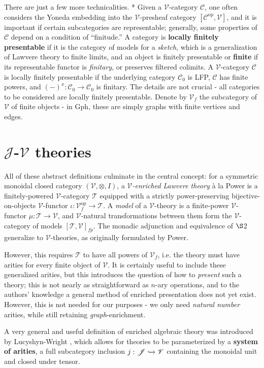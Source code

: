 \documentclass[a4paper,UKenglish]{article}
\theoremstyle{definition}
\newcommand{\Gph}{\mathrm{Gph}}
\newcommand{\op}{\mathrm{op}}
\newcommand{\V}{\mathscr{V}}
\newcommand{\C}{\mathscr{C}}
\newcommand{\T}{\mathscr{T}}
\newcommand{\J}{\mathscr{J}}
\begin{document}
There are just a few more technicalities. * Given a $\V$-category $\C$, one often considers the Yoneda embedding into the $\V$-presheaf category $[\C^\op, \V]$, and it is important if certain subcategories are representable; generally, some properties of $\C$ depend on a condition of ``finitude.'' \cite{finite} A category is \textbf{locally finitely presentable} if it is the category of models for a \textit{sketch}, which is a generalization of Lawvere theory to finite limits, and an object is finitely presentable or \textbf{finite} if its representable functor is \textit{finitary}, or preserves filtered colimits. A $\V$-category $\C$ is locally finitely presentable if the underlying category $\C_0$ is LFP, $\C$ has finite powers, and $(-)^x: \C_0 \to \C_0$ is finitary. The details are not crucial - all categories to be considered are locally finitely presentable. Denote by $\V_f$ the subcategory of $\V$ of finite objects - in $\Gph$, these are simply graphs with finite vertices and edges.\\

\section{$\J$-$\V$ theories}
All of these abstract definitions culminate in the central concept: for a symmetric monoidal closed category $(\V,\otimes,I)$, a \textit{$\V$-enriched Lawvere theory} \`a la Power \cite{power} is a finitely-powered $\V$-category $\T$ equipped with a strictly power-preserving bijective-on-objects $\V$-functor $\iota:\V_f^\op \to \T$. A \textit{model} of a $\V$-theory is a finite-power $\V$-functor $\mu:\T \to \V$, and $\V$-natural transformations between them form the $\V$-category of models $[\T,\V]_{fp}$. The monadic adjunction and equivalence of $\S$2 generalize to $\V$-theories, as originally formulated by Power.

However, this requires $\T$ to have all powers of $\V_f$, i.e. the theory must have arities for every finite object of $\V$. It is certainly useful to include these generalized arities, but this introduces the question of how to \textit{present} such a theory; this is not nearly as straightforward as $n$-ary operations, and to the authors' knowledge a general method of enriched presentation does not yet exist. However, this is not needed for our purposes - we only need \textit{natural number} arities, while still retaining \textit{graph}-enrichment.

A very general and useful definition of enriched algebraic theory was introduced by Lucyshyn-Wright \cite{rbb}, which allows for theories to be parameterized by a \textbf{system of arities}, a full subcategory inclusion $j: \J \xhookrightarrow{} \V$ containing the monoidal unit and closed under tensor.
\end{document}
